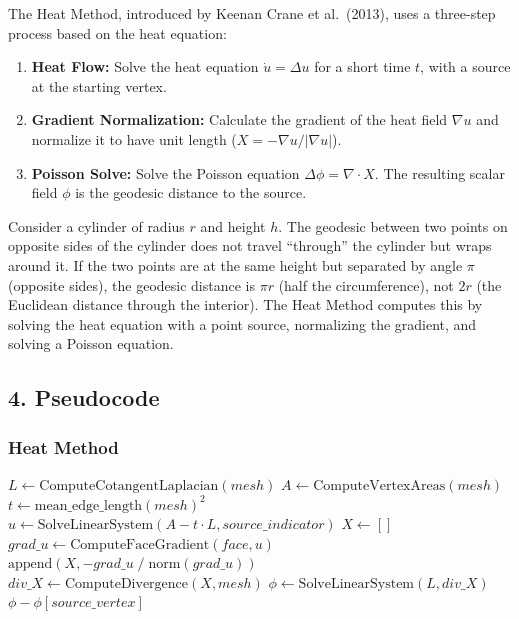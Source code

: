 The Heat Method\cite{crane2013geodesic}, introduced by Keenan Crane et al.\ (2013), uses a three-step process based on the heat equation:
\begin{enumerate}
    \item \textbf{Heat Flow:} Solve the heat equation $\dot{u} = \Delta u$ for a short time $t$, with a source at the starting vertex.
    \item \textbf{Gradient Normalization:} Calculate the gradient of the heat field $\nabla u$ and normalize it to have unit length ($X = -\nabla u / |\nabla u|$).
    \item \textbf{Poisson Solve:} Solve the Poisson equation $\Delta \phi = \nabla \cdot X$. The resulting scalar field $\phi$ is the geodesic distance to the source.
\end{enumerate}



\begin{example}\label{ex:geodesic_cylinder}
Consider a cylinder of radius $r$ and height $h$. The geodesic between two points on opposite sides of the cylinder does not travel ``through'' the cylinder but wraps around it. If the two points are at the same height but separated by angle $\pi$ (opposite sides), the geodesic distance is $\pi r$ (half the circumference), not $2r$ (the Euclidean distance through the interior). The Heat Method computes this by solving the heat equation with a point source, normalizing the gradient, and solving a Poisson equation.
\end{example}

\subsection{4. Pseudocode}

\subsubsection{Heat Method}

\begin{algorithm}
\caption{Compute Geodesic via Heat Method}
\label{alg:compute_geodesic_heat}
\begin{algorithmic}[1]
    \State $L \gets \text{ComputeCotangentLaplacian}(mesh)$
    \State $A \gets \text{ComputeVertexAreas}(mesh)$
    \State $t \gets \text{mean\_edge\_length}(mesh)^2$
    \State $u \gets \text{SolveLinearSystem}(A - t \cdot L, source\_indicator)$
    \State $X \gets []$
        \State $grad\_u \gets \text{ComputeFaceGradient}(face, u)$
        \State $\text{append}(X, -grad\_u \;/\; \text{norm}(grad\_u))$
    \EndFor
    \State $div\_X \gets \text{ComputeDivergence}(X, mesh)$
    \State $\phi \gets \text{SolveLinearSystem}(L, div\_X)$
    \State \Return $\phi - \phi[source\_vertex]$ 
\EndFunction
\end{algorithmic}
\end{algorithm}

